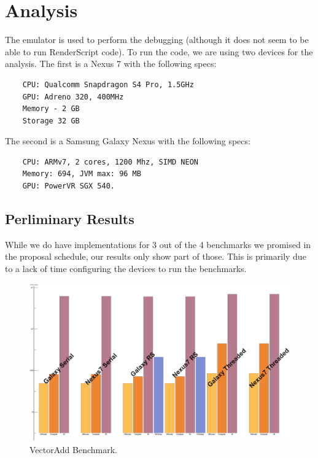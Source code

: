 \section*{Analysis}
\label{sec:analysis}

The emulator is used to perform the debugging (although it does not seem to be able to run RenderScript code).
To run the code, we are using two devices for the analysis.
The first is a Nexus 7 with the following specs:

\begin{verbatim}
    CPU: Qualcomm Snapdragon S4 Pro, 1.5GHz
    GPU: Adreno 320, 400MHz
    Memory - 2 GB
    Storage 32 GB
\end{verbatim}

The second is a Samsung Galaxy Nexus with the following specs:

\begin{verbatim}
    CPU: ARMv7, 2 cores, 1200 Mhz, SIMD NEON
    Memory: 694, JVM max: 96 MB
    GPU: PowerVR SGX 540.
\end{verbatim}


\subsection*{Perliminary Results}

While we do have implementations for 3 out of the 4 benchmarks we promised in the proposal schedule,
  our results only show part of those.
This is primarily due to a lack of time configuring the devices to run the benchmarks.


\begin{figure}[t!]
\includegraphics[scale=0.125]{VectorAdd.png}
\caption{VectorAdd Benchmark.}
\label{fig:schedule}
\centering
\end{figure}



